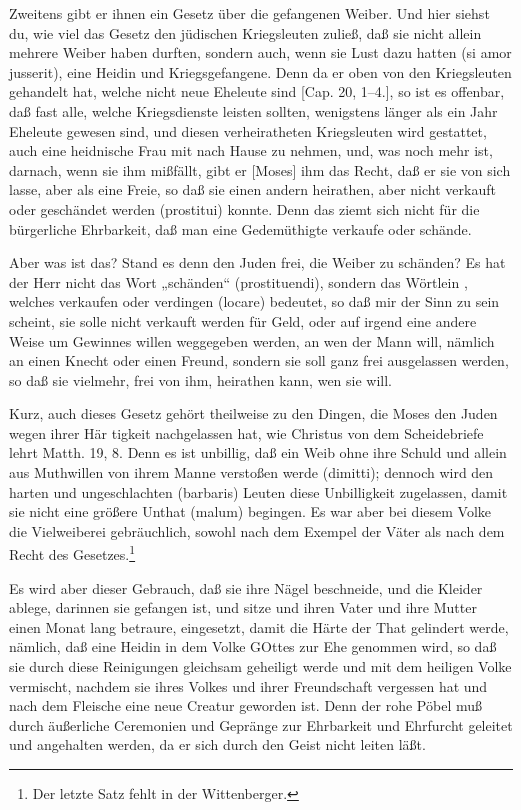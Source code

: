 Zweitens gibt er ihnen ein Gesetz über die gefangenen Weiber. Und hier siehst du, wie viel das Gesetz den jüdischen Kriegsleuten zuließ, daß sie nicht allein mehrere Weiber haben durften, sondern auch, wenn sie Lust dazu hatten (si amor jusserit), eine Heidin und Kriegsgefangene. Denn da er oben von den Kriegsleuten gehandelt hat, welche nicht neue Eheleute sind [Cap. 20, 1–4.], so ist es offenbar, daß fast alle, welche Kriegsdienste leisten sollten, wenigstens länger als ein Jahr Eheleute gewesen sind, und diesen verheiratheten Kriegsleuten wird gestattet, auch eine heidnische Frau mit nach Hause zu nehmen, und, was noch mehr ist, darnach, wenn sie ihm mißfällt, gibt er [Moses] ihm das Recht, daß er sie von sich lasse, aber als eine Freie, so daß sie einen andern heirathen, aber nicht verkauft oder geschändet werden (prostitui) konnte. Denn das ziemt sich nicht für die bürgerliche Ehrbarkeit, daß man eine Gedemüthigte verkaufe oder schände.

Aber was ist das? Stand es denn den Juden frei, die Weiber zu schänden? Es hat der Herr nicht das Wort „schänden“ (prostituendi), sondern das Wörtlein , welches verkaufen oder verdingen (locare) bedeutet, so daß mir der Sinn zu sein scheint, sie solle nicht verkauft werden für Geld, oder auf irgend eine andere Weise um Gewinnes willen weggegeben werden, an wen der Mann will, nämlich an einen Knecht oder einen Freund, sondern sie soll ganz frei ausgelassen werden, so daß sie vielmehr, frei von ihm, heirathen kann, wen sie will.

Kurz, auch dieses Gesetz gehört theilweise zu den Dingen, die Moses den Juden wegen ihrer Här tigkeit nachgelassen hat, wie Christus von dem Scheidebriefe lehrt Matth. 19, 8. Denn es ist unbillig, daß ein Weib ohne ihre Schuld und allein aus Muthwillen von ihrem Manne verstoßen werde (dimitti); dennoch wird den harten und ungeschlachten (barbaris) Leuten diese Unbilligkeit zugelassen, damit sie nicht eine größere Unthat (malum) begingen. Es war aber bei diesem Volke die Vielweiberei gebräuchlich, sowohl nach dem Exempel der Väter als nach dem Recht des Gesetzes.\footnote{Der letzte Satz fehlt in der Wittenberger.}

Es wird aber dieser Gebrauch, daß sie ihre Nägel beschneide, und die Kleider ablege, darinnen sie gefangen ist, und sitze und ihren Vater und ihre Mutter einen Monat lang betraure, eingesetzt, damit die Härte der That gelindert werde, nämlich, daß eine Heidin in dem Volke GOttes zur Ehe genommen wird, so daß sie durch diese Reinigungen gleichsam geheiligt werde und mit dem heiligen Volke vermischt, nachdem sie ihres Volkes und ihrer Freundschaft vergessen hat und nach dem Fleische eine neue Creatur geworden ist. Denn der rohe Pöbel muß durch äußerliche Ceremonien und Gepränge zur Ehrbarkeit und Ehrfurcht geleitet und angehalten werden, da er sich durch den Geist nicht leiten läßt.

